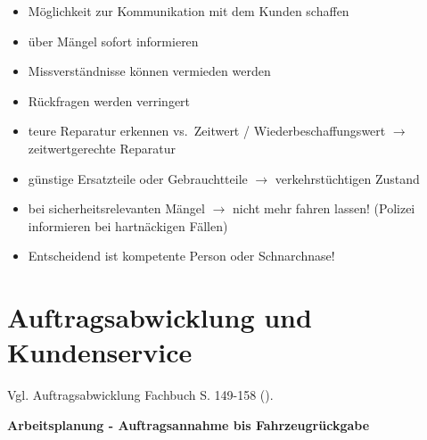 \begin{itemize}
\item
  Möglichkeit zur Kommunikation mit dem Kunden schaffen
\item
  über Mängel sofort informieren
\item
  Missverständnisse können vermieden werden
\item
  Rückfragen werden verringert
\item
  teure Reparatur erkennen vs.~Zeitwert / Wiederbeschaffungswert $\to$
  zeitwertgerechte Reparatur
\item
  günstige Ersatzteile oder Gebrauchtteile $\to$ verkehrstüchtigen
  Zustand
\item
  bei sicherheitsrelevanten Mängel $\to$ nicht mehr fahren lassen!
  (Polizei informieren bei hartnäckigen Fällen)
\item
  Entscheidend ist kompetente Person oder Schnarchnase!
\end{itemize}

\section{Auftragsabwicklung und
Kundenservice}\label{auftragsabwicklung-und-kundenservice}

Vgl. Auftragsabwicklung Fachbuch S. 149-158
(\textcite{heiser:2017:betriebsfuhrung}).

\textbf{Arbeitsplanung - Auftragsannahme bis Fahrzeugrückgabe}

